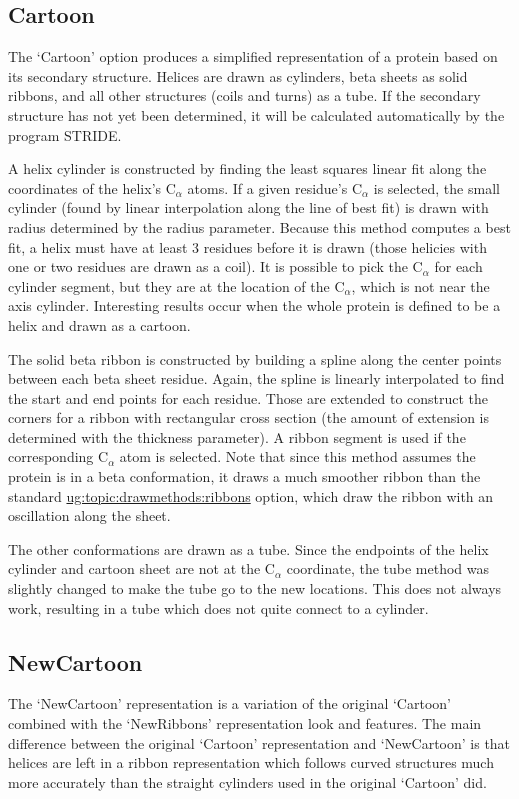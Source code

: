 \subsection{Cartoon}
\label{ug:topic:drawmethods:cartoon}
The `Cartoon' option produces a simplified representation of a protein
based on its secondary structure.  Helices are drawn as cylinders,
beta sheets as solid ribbons, and all other structures (coils and
turns) as a tube.  If the secondary structure has not yet been
determined, it will be calculated automatically by the program STRIDE.

A helix cylinder is constructed by finding the least squares linear
fit along the coordinates of the helix's C${}_\alpha$ atoms.  If a
given residue's C${}_\alpha$ is selected, the small cylinder (found by
linear interpolation along the line of best fit) is drawn with radius
determined by the radius parameter.  Because this method computes a best
fit, a helix must have at least 3 residues before it is drawn (those
helicies with one or two residues are drawn as a coil).  It is
possible to pick the C${}_\alpha$ for each cylinder segment, but they
are at the location of the C${}_\alpha$, which is not near the axis
cylinder.  Interesting results occur when the whole protein is defined
to be a helix and drawn as a cartoon.

The solid beta ribbon is constructed by building a spline along the
center points between each beta sheet residue.  Again, the spline is
linearly interpolated to find the start and end points for each
residue.  Those are extended to construct the corners for a ribbon
with rectangular cross section (the amount of extension is determined
with the {\sf thickness} parameter).  A ribbon segment is used if the
corresponding C${}_\alpha$ atom is selected.  Note that since this method
assumes the protein is in a beta conformation, it draws a much
smoother ribbon than the standard \hyperref{`Ribbons'}{`Ribbons'
[\S~}{]}{ug:topic:drawmethods:ribbons} option, which draw the ribbon with an
oscillation along the sheet.

The other conformations are drawn as a tube.  Since the endpoints of
the helix cylinder and cartoon sheet are not at the C${}_\alpha$
coordinate, the tube method was slightly changed to make the tube go
to the new locations.  This does not always work, resulting in a tube
which does not quite connect to a cylinder.


\subsection{NewCartoon}
\label{ug:topic:drawmethods:newcartoon}
The `NewCartoon' representation is a variation of the original `Cartoon'
combined with the `NewRibbons' representation look and features.  The main
difference between the original `Cartoon' representation and `NewCartoon'
is that helices are left in a ribbon representation which follows 
curved structures much more accurately than the straight cylinders used in
the original `Cartoon' did.

